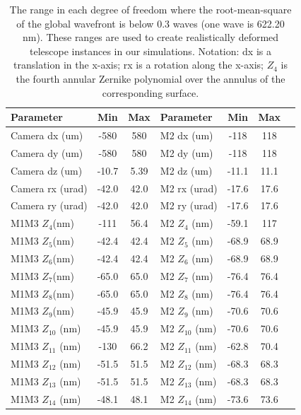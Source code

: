 \begin{table}[!htbp]
\caption[Range of Simulated Control Parameters]{\label{tab:range}The range in each degree of freedom where the root-mean-square of the global wavefront is below 0.3 waves (one wave is 622.20 nm). These ranges are used to create realistically deformed telescope instances in our simulations. Notation: dx is a translation in the x-axis; rx is a rotation along the x-axis; $Z_4$ is the fourth annular Zernike polynomial over the annulus of the corresponding surface.} 
\begin{center}
\begin{tabular}{|l|c|c|l|c|c|r|}
\hline
Parameter & Min & Max & Parameter & Min & Max\\
\hline
Camera dx \hfill (um) & -580 & 580 & M2 dx \hfill (um) & -118 & 118 \\
Camera dy \hfill (um) & -580 & 580 & M2 dy \hfill (um) & -118 & 118 \\
Camera dz \hfill (um) & -10.7 & 5.39 & M2 dz \hfill (um) & -11.1 & 11.1 \\
Camera rx \hfill (urad) & -42.0 & 42.0 & M2 rx \hfill (urad)& -17.6 & 17.6 \\
Camera ry \hfill (urad) & -42.0 & 42.0 & M2 ry \hfill (urad) & -17.6 & 17.6 \\
M1M3 $Z_4 $\hfill (nm) & -111 & 56.4 & M2 $Z_4 $ \hfill (nm) & -59.1 & 117 \\
M1M3 $Z_5 $\hfill (nm) & -42.4 & 42.4 & M2 $Z_5 $ \hfill (nm) & -68.9 & 68.9 \\
M1M3 $Z_6 $\hfill (nm) & -42.4 & 42.4 & M2 $Z_6 $ \hfill (nm) & -68.9 & 68.9 \\
M1M3 $Z_7 $\hfill (nm) & -65.0 & 65.0 & M2 $Z_7 $ \hfill (nm) & -76.4 & 76.4 \\
M1M3 $Z_8 $\hfill (nm) & -65.0 & 65.0 & M2 $Z_8 $ \hfill (nm) & -76.4 & 76.4 \\
M1M3 $Z_9 $\hfill (nm) & -45.9 & 45.9 & M2 $Z_9 $ \hfill (nm) & -70.6 & 70.6 \\
M1M3 $Z_{10}$ \hfill (nm) & -45.9 & 45.9 & M2 $Z_{10} $ \hfill (nm) & -70.6 & 70.6 \\
M1M3 $Z_{11}$ \hfill (nm) & -130 & 66.2 & M2 $Z_{11} $ \hfill (nm) & -62.8 & 70.4 \\
M1M3 $Z_{12}$ \hfill (nm) & -51.5 & 51.5 & M2 $Z_{12}$ \hfill (nm) & -68.3 & 68.3 \\
M1M3 $Z_{13}$ \hfill (nm) & -51.5 & 51.5 & M2 $Z_{13}$ \hfill (nm) & -68.3 & 68.3 \\
M1M3 $Z_{14}$ \hfill (nm) & -48.1 & 48.1 & M2 $Z_{14}$ \hfill (nm) & -73.6 & 73.6 \\

\end{tabular}
\end{center}
\end{table}
